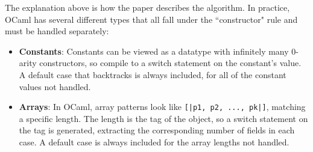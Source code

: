 The explanation above is how the paper describes the algorithm. In practice, OCaml has several different types that all fall under the ``constructor" rule and must be handled separately:
\begin{itemize}
\item \textbf{Constants}: Constants can be viewed as a datatype with infinitely many 0-arity constructors, so compile to a switch statement on the constant's value. A default case that backtracks is always included, for all of the constant values not handled.


\item \textbf{Arrays}: In OCaml, array patterns look like \verb"[|p1, p2, ..., pk|]", matching a specific length. 
The length is the tag of the object, so a switch statement on the tag is generated, extracting the corresponding number of fields in each case. 
A default case is always included for the array lengths not handled.



\end{itemize}
